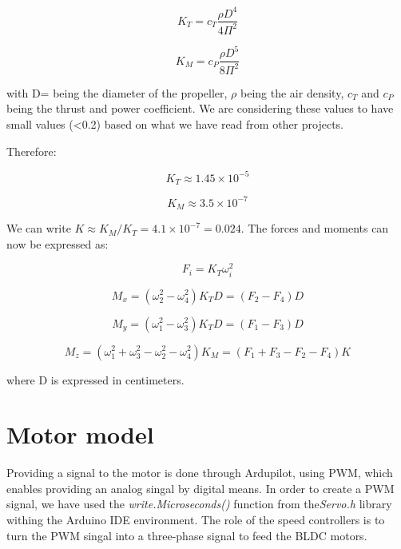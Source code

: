 \begin{equation}
	K_{T}=c_{T}\frac{\rho D^{4}}{4\Pi^{2}}
\end{equation}

\begin{equation}
	K_{M}=c_{P}\frac{\rho D^{5}}{8\Pi^{2}}
\end{equation}

with D= being the diameter of the propeller, $\rho$ being the air density, $ c_{T} $ and $ c_{P} $ being the thrust and power coefficient. We are considering these values to have small values (<0.2) based on what we have read from other projects.

Therefore:

\begin{equation}
	K_{T}\approx 1.45\times10^{-5}
\end{equation}

\begin{equation}
	K_{M} \approx 3.5\times10^{-7}
\end{equation}


We can write $K \approx K_{M}/K_{T}=4.1\times10^{-7}=0.024$. The forces and moments can now be expressed as:

\begin{equation}
	F_{i}=K_{T}\omega_{i}^{2}
\end{equation}

\begin{equation}
	M_{x}=(\omega_{2}^{2}-\omega_{4}^{2})K_{T}D=(F_{2}-F_{4})D
\end{equation}

\begin{equation}
	M_{y}=(\omega_{1}^{2}-\omega_{3}^{2})K_{T}D=(F_{1}-F_{3})D
\end{equation}

\begin{equation}
	M_{z}=(\omega_{1}^{2}+\omega_{3}^{2}-\omega_{2}^{2}-\omega_{4}^{2})K_{M}=(F_{1}+F_{3}-F_{2}-F_{4})K
\end{equation}

where D is expressed in centimeters.

\section{Motor model}
Providing a signal to the motor is done through Ardupilot, using PWM, which enables providing an analog singal by digital means.  In order to create a PWM signal, we have used the \textit{write.Microseconds()} function from the\textit{Servo.h} library withing the Arduino IDE environment. The role of the speed controllers is to turn the PWM singal into a three-phase signal to feed the BLDC motors.

